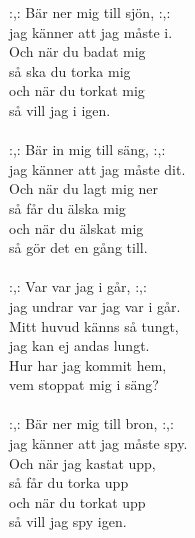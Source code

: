 
            :,: Bär ner mig till sjön, :,:  \\
            jag känner att jag måste i.  \\
            Och när du badat mig  \\
            så ska du torka mig \\
            och när du torkat mig  \\
            så vill jag i igen. \\
\hspace{10mm} \\
            :,: Bär in mig till säng, :,:  \\
            jag känner att jag måste dit.  \\
            Och när du lagt mig ner  \\
            så får du älska mig  \\
            och när du älskat mig  \\
            så gör det en gång till. \\
\hspace{10mm} \\
            :,: Var var jag i går, :,:  \\
            jag undrar var jag var i går. \\
            Mitt huvud känns så tungt,  \\
            jag kan ej andas lungt.  \\
            Hur har jag kommit hem,  \\
            vem stoppat mig i säng? \\
\hspace{10mm} \\
            :,: Bär ner mig till bron, :,:  \\
            jag känner att jag måste spy.  \\
            Och när jag kastat upp,  \\
            så får du torka upp  \\
            och när du torkat upp  \\
            så vill jag spy igen. \\

